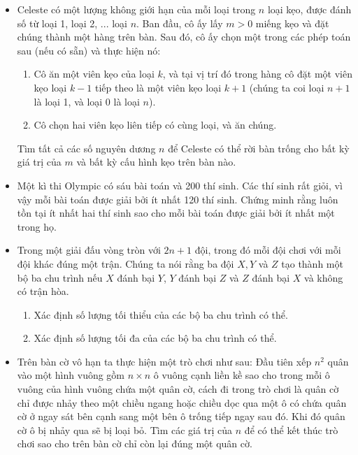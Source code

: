 \documentclass[11pt]{scrartcl}
\begin{document}
\begin{itemize}[label=, leftmargin=0em, itemsep=-0em]
    \item \begin{btvn}
        Celeste có một lượng không giới hạn của mỗi loại trong $n$ loại kẹo, được đánh số từ loại 1, loại 2, ... loại $n$. Ban đầu, cô ấy lấy $m>0$ miếng kẹo và đặt chúng thành một hàng trên bàn. Sau đó, cô ấy chọn một trong các phép toán sau (nếu có sẵn) và thực hiện nó:
        \begin{enumerate}
            \item Cô ăn một viên kẹo của loại $k$, và tại vị trí đó trong hàng cô đặt một viên kẹo loại $k-1$ tiếp theo là một viên kẹo loại $k+1$ (chúng ta coi loại $n+1$ là loại 1, và loại 0 là loại $n$).
            \item Cô chọn hai viên kẹo liên tiếp có cùng loại, và ăn chúng.
        \end{enumerate}
        Tìm tất cả các số nguyên dương $n$ để Celeste có thể rời bàn trống cho bất kỳ giá trị của $m$ và bất kỳ cấu hình kẹo trên bàn nào.
    \end{btvn}

    \item \begin{btvn}
        Một kì thi Olympic có sáu bài toán và 200 thí sinh. Các thí sinh rất giỏi, vì vậy mỗi bài toán được giải bởi ít nhất 120 thí sinh. Chứng minh rằng luôn tồn tại ít nhất hai thí sinh sao cho mỗi bài toán được giải bởi ít nhất một trong họ.
    \end{btvn}

    \item \begin{btvn}
        Trong một giải đấu vòng tròn với $2n+1$ đội, trong đó mỗi đội chơi với mỗi đội khác đúng một trận. Chúng ta nói rằng ba đội $X,Y$ và $Z$ tạo thành một bộ ba chu trình nếu $X$ đánh bại $Y$, $Y$ đánh bại $Z$ và $Z$ đánh bại $X$ và không có trận hòa.
        \begin{enumerate}[label=(\alph*)]
            \item Xác định số lượng tối thiểu của các bộ ba chu trình có thể.
            \item  Xác định số lượng tối đa của các bộ ba chu trình có thể.
        \end{enumerate}        
    \end{btvn}
    \item \begin{btvn} Trên bàn cờ vô hạn ta thực hiện một trò chơi như sau: Đầu tiên xếp $n^2$ quân vào một hình vuông gồm $n \times n$ ô vuông cạnh liền kề sao cho trong mỗi ô vuông của hình vuông chứa một quân cờ, cách đi trong trò chơi là quân cờ chỉ được nhảy theo một chiều ngang hoặc chiều dọc qua một ô có chứa quân cờ ở ngay sát bên cạnh sang một bên ô trống tiếp ngay sau đó. Khi đó quân cờ ô bị nhảy qua sẽ bị loại bỏ. Tìm các giá trị của $n$ để có thể kết thúc trò chơi sao cho trên bàn cờ chỉ còn lại đúng một quân cờ.
    \end{btvn}



\end{itemize}
\end{document}
